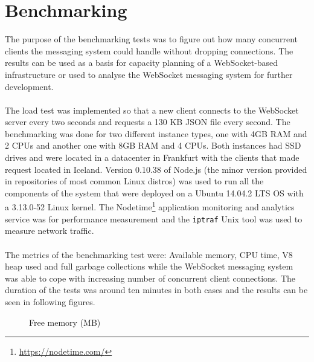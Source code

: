 \section{Benchmarking}

The purpose of the benchmarking tests was to figure out how many concurrent clients the messaging system could handle without dropping connections. The results can be used as a basis for capacity planning of a WebSocket-based infrastructure or used to analyse the WebSocket messaging system for further development.
\\ \\
The load test was implemented so that a new client connects to the WebSocket server every two seconds and requests a 130 KB JSON file every second. The benchmarking was done for two different instance types, one with 4GB RAM  and 2 CPUs and another one with 8GB RAM and 4 CPUs. Both instances had SSD drives and were located in a datacenter in Frankfurt with the clients that made request located in Iceland. Version 0.10.38 of Node.js (the minor version provided in repositories of most common Linux distros) was used to run all the components of the system that were deployed on a Ubuntu 14.04.2 LTS OS with a 3.13.0-52 Linux kernel. The Nodetime\footnote{\url{https://nodetime.com/}} application monitoring and analytics service was for performance measurement and the \texttt{iptraf} Unix tool was used to measure network traffic.
\\ \\
The metrics of the benchmarking test were: Available memory, CPU time, V8 heap used and full garbage collections while the WebSocket messaging system was able to cope with increasing number of concurrent client connections. The duration of the tests was around ten minutes in both cases and the results can be seen in following figures.
\\
\begin{figure}[h!]
	\centering
	 \hfill
	\caption{Free memory (MB)}
	\label{fig:freeMemory}
\end{figure}


